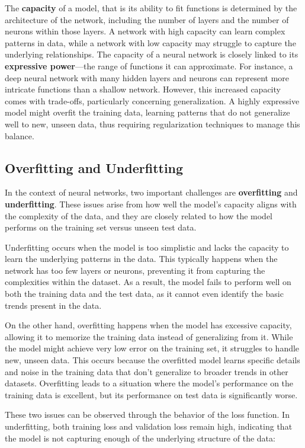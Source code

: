 The \textbf{capacity} of a model, that is its ability to fit functions is determined by the architecture of the network, including the number of layers and the number of neurons within those layers. A network with high capacity can learn complex patterns in data, while a network with low capacity may struggle to capture the underlying relationships. The capacity of a neural network is closely linked to its \textbf{expressive power}—the range of functions it can approximate. For instance, a deep neural network with many hidden layers and neurons can represent more intricate functions than a shallow network. However, this increased capacity comes with trade-offs, particularly concerning generalization. A highly expressive model might overfit the training data, learning patterns that do not generalize well to new, unseen data, thus requiring regularization techniques to manage this balance.


\subsection{Overfitting and Underfitting}

In the context of neural networks, two important challenges are \textbf{overfitting} and \textbf{underfitting}. These issues arise from how well the model's capacity aligns with the complexity of the data, and they are closely related to how the model performs on the training set versus unseen test data.

Underfitting occurs when the model is too simplistic and lacks the capacity to learn the underlying patterns in the data. This typically happens when the network has too few layers or neurons, preventing it from capturing the complexities within the dataset. As a result, the model fails to perform well on both the training data and the test data, as it cannot even identify the basic trends present in the data.

On the other hand, overfitting happens when the model has excessive capacity, allowing it to memorize the training data instead of generalizing from it. While the model might achieve very low error on the training set, it struggles to handle new, unseen data. This occurs because the overfitted model learns specific details and noise in the training data that don't generalize to broader trends in other datasets. Overfitting leads to a situation where the model's performance on the training data is excellent, but its performance on test data is significantly worse.

These two issues can be observed through the behavior of the loss function. In underfitting, both training loss and validation loss remain high, indicating that the model is not capturing enough of the underlying structure of the data: 

